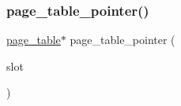 \mbox{\label{page__table_8_c_a53208086adbea2817fe45f917410d9d0}} 
\subsubsection{\texorpdfstring{page\+\_\+table\+\_\+pointer()}{page\_table\_pointer()}}
{\footnotesize\ttfamily \mbox{\hyperlink{classpage__table}{page\+\_\+table}}$\ast$ page\+\_\+table\+\_\+pointer (\begin{DoxyParamCaption}\item[{\mbox{\hyperlink{galois_8h_a09fddde158a3a20bd2dcadb609de11dc}{I\+NT}}}]{slot }\end{DoxyParamCaption})}

